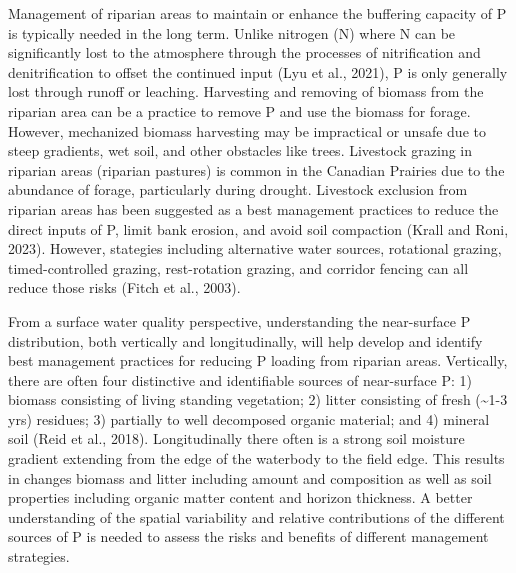 \documentclass[
]{agujournal2019}
\begin{document}
Management of riparian areas to maintain or enhance the buffering
capacity of P is typically needed in the long term. Unlike nitrogen (N)
where N can be significantly lost to the atmosphere through the
processes of nitrification and denitrification to offset the continued
input (Lyu et al., 2021), P is only generally lost through runoff or
leaching. Harvesting and removing of biomass from the riparian area can
be a practice to remove P and use the biomass for forage. However,
mechanized biomass harvesting may be impractical or unsafe due to steep
gradients, wet soil, and other obstacles like trees. Livestock grazing
in riparian areas (riparian pastures) is common in the Canadian Prairies
due to the abundance of forage, particularly during drought. Livestock
exclusion from riparian areas has been suggested as a best management
practices to reduce the direct inputs of P, limit bank erosion, and
avoid soil compaction (Krall and Roni, 2023). However, stategies
including alternative water sources, rotational grazing,
timed-controlled grazing, rest-rotation grazing, and corridor fencing
can all reduce those risks (Fitch et al., 2003).

From a surface water quality perspective, understanding the near-surface
P distribution, both vertically and longitudinally, will help develop
and identify best management practices for reducing P loading from
riparian areas. Vertically, there are often four distinctive and
identifiable sources of near-surface P: 1) biomass consisting of living
standing vegetation; 2) litter consisting of fresh (\textasciitilde1-3
yrs) residues; 3) partially to well decomposed organic material; and 4)
mineral soil (Reid et al., 2018). Longitudinally there often is a strong
soil moisture gradient extending from the edge of the waterbody to the
field edge. This results in changes biomass and litter including amount
and composition as well as soil properties including organic matter
content and horizon thickness. A better understanding of the spatial
variability and relative contributions of the different sources of P is
needed to assess the risks and benefits of different management
strategies.
\end{document}
